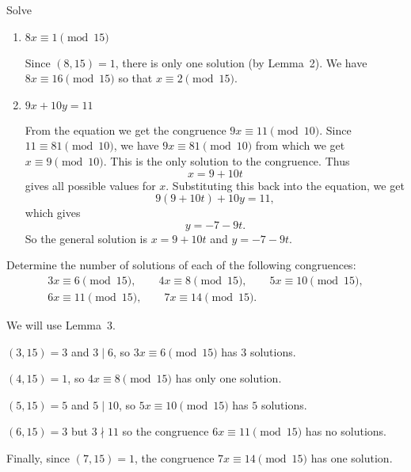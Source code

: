  Solve
\begin{enumerate}
\item $8x\equiv1\pmod{15}$
  \begin{solution}
    Since $(8,15) = 1$, there is only one solution (by Lemma~2). We
    have $8x\equiv16\pmod{15}$ so that $x\equiv2\pmod{15}$.
  \end{solution}
\item $9x + 10y = 11$
  \begin{solution}
    From the equation we get the congruence
    $9x\equiv11\pmod{10}$. Since $11\equiv81\pmod{10}$, we have
    $9x\equiv81\pmod{10}$ from which we get $x\equiv9\pmod{10}$. This
    is the only solution to the congruence. Thus
    \begin{equation*}
      x = 9 + 10t
    \end{equation*}
    gives all possible values for $x$. Substituting this back into the
    equation, we get
    \begin{equation*}
      9(9 + 10t) + 10y = 11,
    \end{equation*}
    which gives
    \begin{equation*}
      y = -7 - 9t.
    \end{equation*}
    So the general solution is $x = 9 + 10t$ and $y = -7 - 9t$.
  \end{solution}
\end{enumerate}

\label{exercise:lin-cong:sampler}
Determine the number of solutions of each of the following
congruences:
\begin{gather*}
  3x\equiv6\pmod{15},\qquad 4x\equiv8\pmod{15},\qquad 5x\equiv10\pmod{15}, \\
  6x\equiv11\pmod{15},\qquad 7x\equiv14\pmod{15}.
\end{gather*}
\begin{solution}
  We will use Lemma~3.

  $(3,15) = 3$ and $3\mid6$, so $3x\equiv6\pmod{15}$ has $3$
  solutions.

  $(4,15) = 1$, so $4x\equiv8\pmod{15}$ has only one solution.

  $(5,15) = 5$ and $5\mid{10}$, so $5x\equiv10\pmod{15}$ has $5$
  solutions.

  $(6,15) = 3$ but $3\nmid11$ so the congruence $6x\equiv11\pmod{15}$
  has no solutions.

  Finally, since $(7,15) = 1$, the congruence $7x\equiv14\pmod{15}$
  has one solution.
\end{solution}

